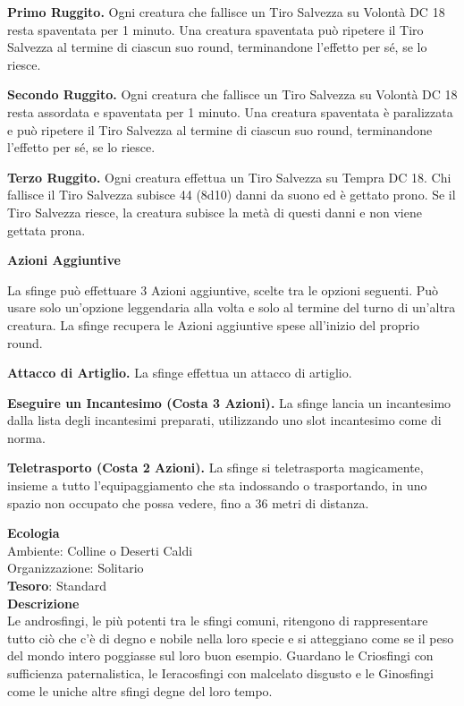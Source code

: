 \begin{multicols}{2}
	\textbf{Primo Ruggito.} Ogni creatura che fallisce un Tiro Salvezza su Volontà DC 18 resta spaventata per 1 minuto. Una creatura spaventata può ripetere il Tiro Salvezza al termine di ciascun suo round, terminandone l'effetto per sé, se lo riesce.

	\textbf{Secondo Ruggito.} Ogni creatura che fallisce un Tiro Salvezza su Volontà DC 18 resta assordata e spaventata per 1 minuto. Una creatura spaventata è paralizzata e può ripetere il Tiro Salvezza al termine di ciascun suo round, terminandone l'effetto per sé, se lo riesce.

	\textbf{Terzo Ruggito.} Ogni creatura effettua un Tiro Salvezza su Tempra DC 18. Chi fallisce il Tiro Salvezza subisce 44 (8d10) danni da suono ed è gettato prono. Se il Tiro Salvezza riesce, la creatura subisce la metà di questi danni e non viene gettata prona.

	\textbf{Azioni Aggiuntive}

	La sfinge può effettuare 3 Azioni aggiuntive, scelte tra le opzioni seguenti. Può usare solo un'opzione leggendaria alla volta e solo al termine del turno di un'altra creatura. La sfinge recupera le Azioni aggiuntive spese all'inizio del proprio round.

	\textbf{Attacco di Artiglio.} La sfinge effettua un attacco di artiglio.

	\textbf{Eseguire un Incantesimo (Costa 3 Azioni).} La sfinge lancia un incantesimo dalla lista degli incantesimi preparati, utilizzando uno slot incantesimo come di norma.

	\textbf{Teletrasporto (Costa 2 Azioni).} La sfinge si teletrasporta magicamente, insieme a tutto l'equipaggiamento che sta indossando o trasportando, in uno spazio non occupato che possa vedere, fino a 36 metri di distanza.


	\textbf{Ecologia}\\
	Ambiente: Colline o Deserti Caldi\\
	Organizzazione: Solitario\\
	\textbf{Tesoro}: Standard\\
	\textbf{Descrizione}\\
	Le androsfingi, le più potenti tra le sfingi comuni, ritengono di rappresentare tutto ciò che c'è di degno e nobile nella loro specie e si atteggiano come se il peso del mondo intero poggiasse sul loro buon esempio. Guardano le Criosfingi con sufficienza paternalistica, le Ieracosfingi con malcelato disgusto e le Ginosfingi come le uniche altre sfingi degne del loro tempo.


\end{multicols}
